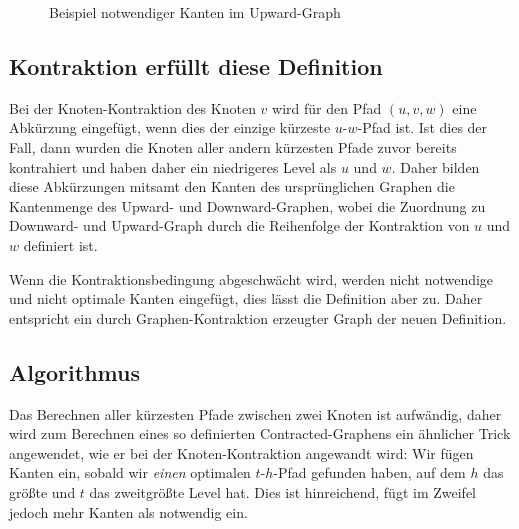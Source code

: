 \begin{figure}[h!]
  \centering
  \caption{Beispiel notwendiger Kanten im Upward-Graph}
  \label{fig:people:notwendige_kanten}
\end{figure}

\subsection{Kontraktion erfüllt diese Definition}

Bei der Knoten-Kontraktion des Knoten $v$ wird für den Pfad $(u, v, w)$ eine Abkürzung eingefügt, wenn dies der einzige kürzeste $u$-$w$-Pfad ist.
Ist dies der Fall, dann wurden die Knoten aller andern kürzesten Pfade zuvor bereits kontrahiert und haben daher ein niedrigeres Level als $u$ und $w$.
Daher bilden diese Abkürzungen mitsamt den Kanten des ursprünglichen Graphen die Kantenmenge des Upward- und Downward-Graphen, wobei die Zuordnung zu Downward- und Upward-Graph durch die Reihenfolge der Kontraktion von $u$ und $w$ definiert ist.

Wenn die Kontraktionsbedingung abgeschwächt wird, werden nicht notwendige und nicht optimale Kanten eingefügt, dies lässt die Definition aber zu.
Daher entspricht ein durch Graphen-Kontraktion erzeugter Graph der neuen Definition.

\subsection{Algorithmus}

Das Berechnen aller kürzesten Pfade zwischen zwei Knoten ist aufwändig, daher wird zum Berechnen eines so definierten Contracted-Graphens ein ähnlicher Trick angewendet, wie er bei der Knoten-Kontraktion angewandt wird:
Wir fügen Kanten ein, sobald wir \emph{einen} optimalen $t$-$h$-Pfad gefunden haben, auf dem $h$ das größte und $t$ das zweitgrößte Level hat.
Dies ist hinreichend, fügt im Zweifel jedoch mehr Kanten als notwendig ein.

